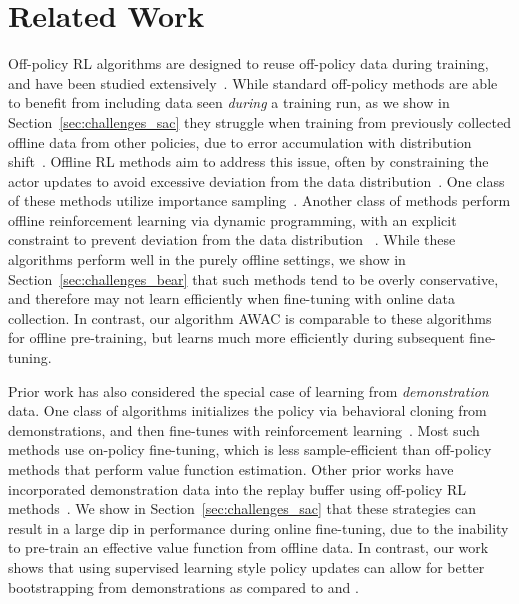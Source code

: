 \section{Related Work}\label{sec:related_work}
Off-policy RL algorithms are designed to reuse off-policy data during training, and have been studied extensively~\citep{konda2000actorcritic, degris2012, mnih2016asynchronous, haarnoja2018sac, fujimoto2018td3, bhatnagar2009, peters2008, zhang2019, pawel2009, balduzzi2015}. While standard off-policy methods are able to benefit from including data seen \emph{during} a training run, as we show in Section~\ref{sec:challenges_sac} they struggle when training from previously collected offline data from other policies, due to error accumulation with distribution shift~\citep{fujimoto19bcq, kumar19bear}. Offline RL methods aim to address this issue, often by constraining the actor updates to avoid excessive deviation from the data distribution~\citep{lange2012, thomas2016, hallak2015offpolicy, hallak2016td, hallak2017onlineoffpolicy, agarwal2019optimism, kumar19bear, fujimoto19bcq, rasool2019p3o, nachum2019dualdice, siegel2020abm, levine2020offlinetutorial, zhang2020gendice}. One class of these methods utilize importance sampling~\citep{thomas2016, zhang2020gendice, nachum2019dualdice, degris2012, jiang2016doublyrobust, hallak2017onlineoffpolicy}. 
Another class of methods perform offline reinforcement learning via dynamic programming, with an explicit constraint to prevent deviation from the data distribution ~\citep{lange2012, kumar19bear, fujimoto19bcq, wu2019brac, jaques2019}. While these algorithms perform well in the purely offline settings, we show in Section~\ref{sec:challenges_bear} that such methods tend to be overly conservative, and therefore may not learn efficiently when fine-tuning with online data collection. In contrast, our algorithm AWAC is comparable to these algorithms for offline pre-training, but learns much more efficiently during subsequent fine-tuning. 

Prior work has also considered the special case of learning from \emph{demonstration} data. One class of algorithms initializes the policy via behavioral cloning from demonstrations, and then fine-tunes with reinforcement learning~\citep{peters2008baseball, ijspeert2002attractor, Theodorou2010, kim2013apid, rajeswaran2018dextrous, gupta2019relay, zhu2019hands}. Most such methods use on-policy fine-tuning, which is less sample-efficient than off-policy methods that perform value function estimation. 
Other prior works have incorporated demonstration data into the replay buffer using off-policy RL methods~\citep{vecerik17ddpgfd, nair2017icra}. We show in Section~\ref{sec:challenges_sac} that these strategies can result in a large dip in performance during online fine-tuning, due to the inability to pre-train an effective value function from offline data.
In contrast, our work shows that using supervised learning style policy updates can allow for better bootstrapping from demonstrations as compared to \citet{vecerik17ddpgfd} and \citet{nair2017icra}.

